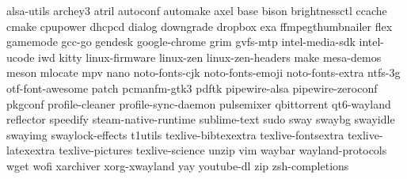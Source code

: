 alsa-utils
archey3
atril
autoconf
automake
axel
base
bison
brightnessctl
ccache
cmake
cpupower
dhcpcd
dialog
downgrade
dropbox
exa
ffmpegthumbnailer
flex
gamemode
gcc-go
gendesk
google-chrome
grim
gvfs-mtp
intel-media-sdk
intel-ucode
iwd
kitty
linux-firmware
linux-zen
linux-zen-headers
make
mesa-demos
meson
mlocate
mpv
nano
noto-fonts-cjk
noto-fonts-emoji
noto-fonts-extra
ntfs-3g
otf-font-awesome
patch
pcmanfm-gtk3
pdftk
pipewire-alsa
pipewire-zeroconf
pkgconf
profile-cleaner
profile-sync-daemon
pulsemixer
qbittorrent
qt6-wayland
reflector
speedify
steam-native-runtime
sublime-text
sudo
sway
swaybg
swayidle
swayimg
swaylock-effects
t1utils
texlive-bibtexextra
texlive-fontsextra
texlive-latexextra
texlive-pictures
texlive-science
unzip
vim
waybar
wayland-protocols
wget
wofi
xarchiver
xorg-xwayland
yay
youtube-dl
zip
zsh-completions
